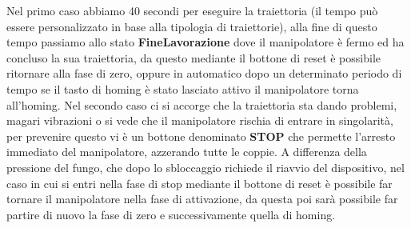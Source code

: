 Nel primo caso abbiamo 40 secondi per eseguire la traiettoria (il tempo può essere personalizzato in base alla tipologia di traiettorie), alla fine di questo tempo passiamo allo stato \textbf{FineLavorazione} dove il manipolatore è fermo ed ha concluso la sua traiettoria, da questo mediante il bottone di reset è possibile ritornare alla fase di zero, oppure in automatico dopo un determinato periodo di tempo se il tasto di homing è stato lasciato attivo il manipolatore torna all'homing. Nel secondo caso ci si accorge che la traiettoria sta dando problemi, magari vibrazioni o si vede che il manipolatore rischia di entrare in singolarità, per prevenire questo vi è un bottone denominato \textbf{STOP} che permette l'arresto immediato del manipolatore, azzerando tutte le coppie. A differenza della pressione del fungo, che dopo lo sbloccaggio richiede il riavvio del dispositivo, nel caso in cui si entri nella fase di stop mediante il bottone di reset è possibile far tornare il manipolatore nella fase di attivazione, da questa poi sarà possibile far partire di nuovo la fase di zero e successivamente quella di homing.
